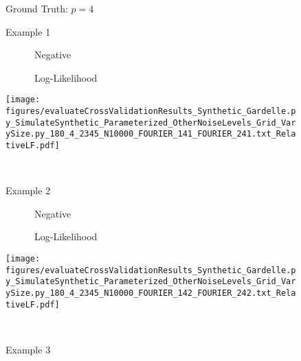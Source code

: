  \begin{figure}
\center

Ground Truth: $p = 4$

Example 1

\begin{minipage}[c]{0.8\linewidth}

\end{minipage}
\begin{minipage}[c]{0.19\linewidth}
\centering

\ \ \ \ \ \ Negative

\ \ \ \ \ \ Log-Likelihood

\texttt{[image: figures/evaluateCrossValidationResults\_Synthetic\_Gardelle.py\_SimulateSynthetic\_Parameterized\_OtherNoiseLevels\_Grid\_VarySize.py\_180\_4\_2345\_N10000\_FOURIER\_141\_FOURIER\_241.txt\_RelativeLF.pdf]}
\end{minipage}

\ 

Example 2

\begin{minipage}[c]{0.8\linewidth}

\end{minipage}
\begin{minipage}[c]{0.19\linewidth}
\centering

\ \ \ \ \ \ Negative

\ \ \ \ \ \ Log-Likelihood

\texttt{[image: figures/evaluateCrossValidationResults\_Synthetic\_Gardelle.py\_SimulateSynthetic\_Parameterized\_OtherNoiseLevels\_Grid\_VarySize.py\_180\_4\_2345\_N10000\_FOURIER\_142\_FOURIER\_242.txt\_RelativeLF.pdf]}
\end{minipage}

\ 

Example 3

\begin{minipage}[c]{0.8\linewidth}


\end{minipage}
\end{figure}
